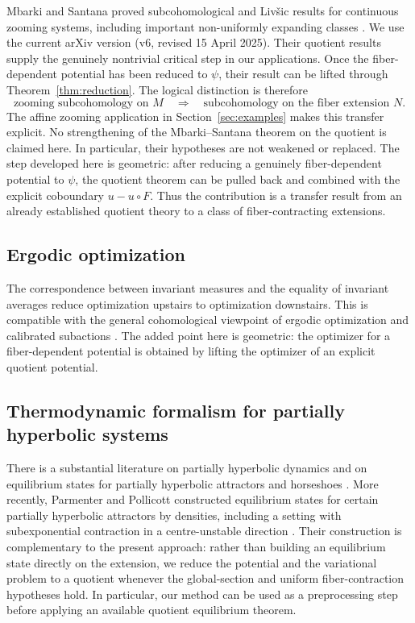 \documentclass[11pt,a4paper]{article}
\begin{document}
Mbarki and Santana proved subcohomological and Liv\v{s}ic results for
continuous zooming systems, including important non-uniformly expanding
classes \cite{MbarkiSantana}. We use the current arXiv version (v6, revised
15 April 2025). Their quotient results supply the genuinely nontrivial
critical step in our applications. Once the fiber-dependent
potential has been reduced to $\psi$, their result can be lifted through
Theorem~\ref{thm:reduction}. The logical distinction is therefore
\[
\text{zooming subcohomology on }M
\quad\Longrightarrow\quad
\text{subcohomology on the fiber extension }N.
\]
The affine zooming application in Section~\ref{sec:examples} makes this
transfer explicit.
No strengthening of the Mbarki--Santana theorem on the quotient is
claimed here. In particular, their hypotheses are not weakened or replaced.
The step developed here is geometric: after reducing a genuinely fiber-dependent
potential to $\psi$, the quotient theorem can be pulled back and combined
with the explicit coboundary $u-u\circ F$. Thus the contribution is a
transfer result from an already established quotient theory to a class of
fiber-contracting extensions.

\subsection{Ergodic optimization}

The correspondence between invariant measures and the equality of invariant
averages reduce optimization upstairs to optimization downstairs. This is
compatible with the general cohomological viewpoint of ergodic optimization
and calibrated subactions \cite{BouschJenkinson,GaribaldiBook,
GaribaldiLopesThieullen}. The added point here is geometric: the optimizer for
a fiber-dependent potential is obtained by lifting the optimizer of an
explicit quotient potential.

\subsection{Thermodynamic formalism for partially hyperbolic systems}

There is a substantial literature on partially hyperbolic dynamics and on
equilibrium states for partially hyperbolic attractors and horseshoes
\cite{AlvesBonattiViana,CastroNascimento,FisherOliveira,RamosSiqueira,
RiosSiqueira,ClimenhagaPesinZelerowicz}. More recently,
Parmenter and Pollicott constructed equilibrium states for certain partially
hyperbolic attractors by densities, including a setting with subexponential
contraction in a centre-unstable direction \cite{ParmenterPollicott}. Their
construction is complementary to the present approach: rather than building
an equilibrium state directly on the extension, we reduce the potential and
the variational problem to a quotient whenever the global-section and uniform
fiber-contraction hypotheses hold. In particular, our method can be used as a
preprocessing step before applying an available quotient equilibrium theorem.
\end{document}
